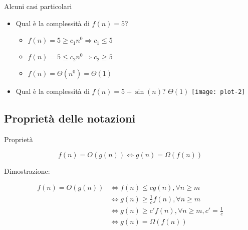 \begin{frame}{Alcuni casi particolari}
\begin{itemize}
\item Qual è la complessità di \alert{$f(n) = 5$}?
  \pause
  \begin{itemize}
	 \item $f(n) = 5 \geq c_1 n^0 \Rightarrow c_1 \leq 5$
	 \item $f(n) = 5 \leq c_2 n^0 \Rightarrow c_2 \geq 5$
	 \item $f(n) = \Theta(n^0) = \Theta(1)$
  \end{itemize}
\pause
\item Qual è la complessità di \alert{$f(n) = 5+\sin(n)$}?
  \pause
  \alert{$\Theta(1)$}
  \texttt{[image: plot-2]}  
\end{itemize}
\end{frame}

\subsection{Proprietà delle notazioni}

\begin{frame}{Proprietà}

\begin{myboxtitle}[Dualità]
\[
	f(n) = O(g(n)) \Leftrightarrow g(n) = \Omega(f(n)) 
\]
\end{myboxtitle}

Dimostrazione:

\begin{align*}
f(n) = O(g(n)) 	& \Leftrightarrow f(n) \leq cg(n), \forall n\geq m \\
				& \Leftrightarrow g(n) \geq \frac{1}{c} f(n), \forall n \geq m \\
				& \Leftrightarrow g(n) \geq c' f(n), \forall n \geq m, c' = \frac{1}{c} \\
				& \Leftrightarrow g(n) = \Omega(f(n))
\end{align*}

\end{frame}

